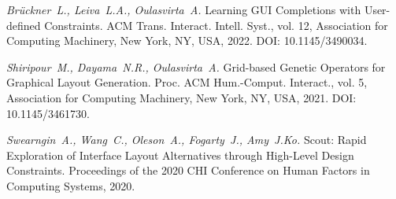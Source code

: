{\em Br\"{u}ckner~L., Leiva~L.A., Oulasvirta~A.} Learning GUI Completions with User-defined Constraints. ACM Trans. Interact. Intell. Syst., vol. 12, Association for Computing Machinery, New York, NY, USA, 2022. DOI: 10.1145/3490034.

\choicelang{ \newpage }{}

{\em Shiripour~M., Dayama~N.R., Oulasvirta~A.} Grid-based Genetic Operators for Graphical Layout Generation. Proc. ACM Hum.-Comput. Interact., vol. 5, Association for Computing Machinery, New York, NY, USA, 2021. DOI: 10.1145/3461730.

{\em Swearngin~A., Wang~C., Oleson~A., Fogarty~J., Amy~J.Ko.} Scout: Rapid Exploration of Interface Layout Alternatives through High-Level Design Constraints. Proceedings of the 2020 CHI Conference on Human Factors in Computing Systems, 2020. %
